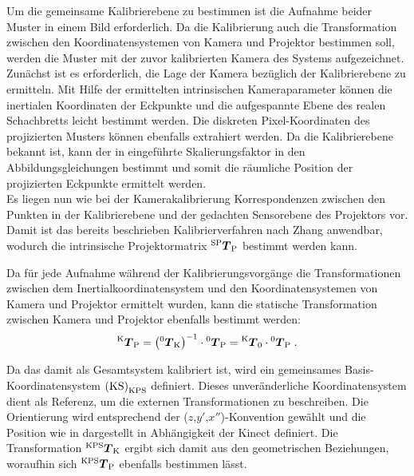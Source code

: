 \prever{
}

Um die gemeinsame Kalibrierebene zu bestimmen ist die Aufnahme beider Muster in einem Bild erforderlich. Da die Kalibrierung auch die Transformation zwischen den Koordinatensystemen von Kamera und Projektor bestimmen soll, werden die Muster mit der zuvor kalibrierten Kamera des Systems aufgezeichnet.\\

Zunächst ist es erforderlich, die Lage der Kamera bezüglich der Kalibrierebene zu ermitteln. Mit Hilfe der ermittelten intrinsischen Kameraparameter können die inertialen Koordinaten der Eckpunkte und die aufgespannte Ebene des realen Schachbretts leicht bestimmt werden. Die diskreten Pixel-Koordinaten des projizierten Musters können ebenfalls extrahiert werden. Da die Kalibrierebene bekannt ist, kann der in  eingeführte Skalierungsfaktor in den Abbildungsgleichungen bestimmt und somit die räumliche Position der projizierten Eckpunkte ermittelt werden.\\

Es liegen nun wie bei der Kamerakalibrierung Korrespondenzen zwischen den Punkten in der Kalibrierebene und der gedachten Sensorebene des Projektors vor. Damit ist das bereits beschrieben Kalibrierverfahren nach Zhang anwendbar, wodurch die intrinsische Projektormatrix ${^{\mathrm{SP}}\mbox{\boldmath{$T$}}_{\mathrm{P}}}$ bestimmt werden kann.\\

\prever{
}

Da für jede Aufnahme während der Kalibrierungsvorgänge die Transformationen zwischen dem Inertialkoordinatensystem und den Koordinatensystemen von Kamera und Projektor ermittelt wurden, kann die statische Transformation zwischen Kamera und Projektor ebenfalls bestimmt werden:
%
\begin{equation}
{^{\mathrm{K}}\mbox{\boldmath{$T$}}_{\mathrm{P}}} = \left( {^{\mathrm{0}}\mbox{\boldmath{$T$}}_{\mathrm{K}}} \right)^{-1} \cdot {^{\mathrm{0}}\mbox{\boldmath{$T$}}_{\mathrm{P}}} = {^{\mathrm{K}}\mbox{\boldmath{$T$}}_{\mathrm{0}}} \cdot {^{\mathrm{0}}\mbox{\boldmath{$T$}}_{\mathrm{P}}} \; \text{.}
\end{equation}

Da das \kps{} damit als Gesamtsystem kalibriert ist, wird ein gemeinsames Basis-Koordinatensystem ${\mathrm{(KS)}}_{\mathrm{KPS}}$ definiert. Dieses unveränderliche Koordinatensystem dient als Referenz, um die externen Transformationen zu beschreiben. Die Orientierung wird entsprechend der ($z$,$y'$,$x''$)-Konvention gewählt und die Position wie in  dargestellt in Abhängigkeit der Kinect definiert. Die Transformation ${^{\mathrm{KPS}}\mbox{\boldmath{$T$}}_{\mathrm{K}}}$ ergibt sich damit aus den geometrischen Beziehungen, woraufhin sich ${^{\mathrm{KPS}}\mbox{\boldmath{$T$}}_{\mathrm{P}}}$ ebenfalls bestimmen lässt.


